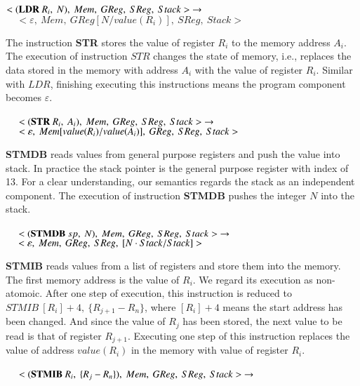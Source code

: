 \documentclass[letterpaper, 10 pt, conference]{IEEEtran}
\begin{document}
$<(\textbf{LDR}~R_i,~N),~Mem,~GReg,~SReg,~Stack>~\rightarrow\\ \\$
$~~~~~<\varepsilon,~Mem,~GReg[N/value(R_i)],~SReg,~Stack>$\\
 \par The instruction \textbf{STR} stores the value of register $R_i$ to the memory address $A_i$. The execution of instruction $STR$ changes the state of memory, i.e., replaces the data stored in the memory with address $A_i$ with the value of register $R_i$. Similar with $LDR$, finishing executing this instructions means the program component becomes $\varepsilon$.\\ \\
$~~~~~<(\textbf{STR} ~R_i,~A_i),~Mem,~GReg,~SReg,~Stack>~\rightarrow\\ \\$
$~~~~~<\varepsilon,~Mem[value(R_i)/value(A_i)],~GReg,~SReg,~Stack>\\ \\$
\par \textbf{STMDB} reads values from general purpose registers and push the value into stack. In practice the stack pointer is the general purpose register with index of 13. For a clear understanding, our semantics regards the stack as an independent component. The execution of instruction \textbf{STMDB} pushes the integer $N$ into the stack.\\ \\
$~~~~~<(\textbf{STMDB} ~sp,~N),~Mem,~GReg,~SReg,~Stack>~\rightarrow\\ \\$
$~~~~~<\varepsilon,~Mem,~GReg,~SReg,~[N\cdot Stack/Stack]>\\ \\$
\par \textbf{STMIB} reads values from a list of registers and store them into the memory. The first memory address is the value of $R_i$.  We regard its execution as non-atomoic. After one step of execution, this instruction is reduced to $STMIB~[R_i]+4,~\{R_{j+1}-R_n\}$, where $[R_i]+4$ means the start address has been changed. And since the value of $R_j$ has been stored, the next value to be read is that of register $R_{j+1}$. Executing one step of this instruction replaces the value of address $value(R_i)$ in the memory with value of register $R_i$.\\ \\
$~~~~~<(\textbf{STMIB} ~R_i,~\{R_j-R_n\}),~Mem,~GReg,~SReg,~Stack>~\rightarrow\\ \\$
\end{document}
